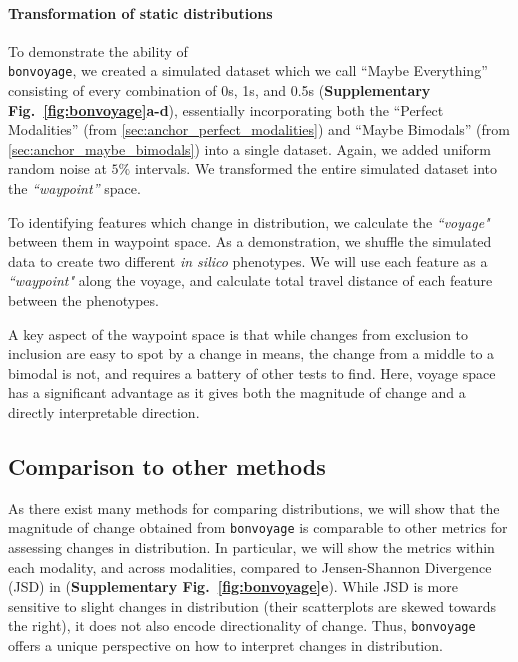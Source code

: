 
\paragraph{Transformation of static distributions}

To demonstrate the ability of \\\texttt{bonvoyage}, we created a simulated dataset which we call ``Maybe Everything'' consisting of every combination of 0s, 1s, and 0.5s (\textbf{Supplementary Fig.~\ref{fig:bonvoyage}a-d}), essentially incorporating both the ``Perfect Modalities'' (from \ref{sec:anchor_perfect_modalities}) and ``Maybe Bimodals'' (from \ref{sec:anchor_maybe_bimodals}) into a single dataset. Again, we added uniform random noise at $5\%$ intervals. We transformed the entire simulated dataset into the \emph{``waypoint''} space.


To identifying features which change in distribution, we calculate the \emph{``voyage"} between them in waypoint space. As a demonstration, we shuffle the simulated data to create two different \emph{in silico} phenotypes. We will use each feature as a \emph{``waypoint"} along the voyage, and calculate total travel distance of each feature between the phenotypes.


A key aspect of the waypoint space is that while changes from exclusion to inclusion are easy to spot by a change in means, the change from a middle to a bimodal is not, and requires a battery of other tests to find. Here, voyage space has a significant advantage as it gives both the magnitude of change and a directly interpretable direction.


\subsection{Comparison to other methods}

As there exist many methods for comparing distributions, we will show that the magnitude of change obtained from \texttt{bonvoyage} is comparable to other metrics for assessing changes in distribution. In particular, we will show the metrics within each modality, and across modalities, compared to Jensen-Shannon Divergence\cite{Anonymous:2011vn} (JSD) in (\textbf{Supplementary Fig.~\ref{fig:bonvoyage}e}). While JSD is more sensitive to slight changes in distribution (their scatterplots are skewed towards the right), it does not also encode directionality of change. Thus, \texttt{bonvoyage} offers a unique perspective on how to interpret changes in distribution.
